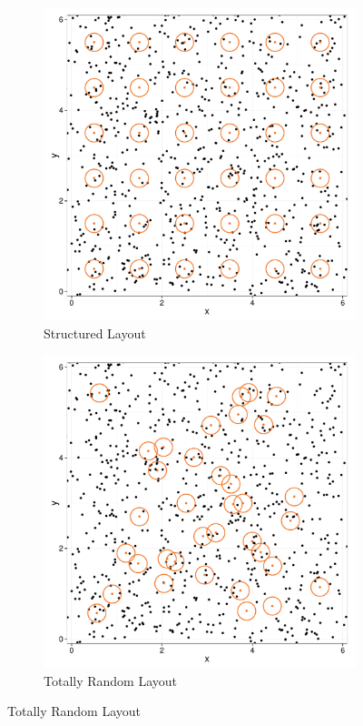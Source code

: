 \documentclass[12pt]{article}
\begin{document}
\begin{figure}
	\begin{subfigure}[b]{0.45\textwidth}
		\includegraphics[width=\textwidth]{../images/layout_structured.pdf}
		\caption{Structured Layout}
		\label{fig:structured}
	\end{subfigure}
	\begin{subfigure}[b]{0.45\textwidth}
		\includegraphics[width=\textwidth]{../images/layout_random.pdf}
		\caption{Totally Random Layout}
		\label{fig:random}
	\end{subfigure}
	

\end{figure}
\end{document}
